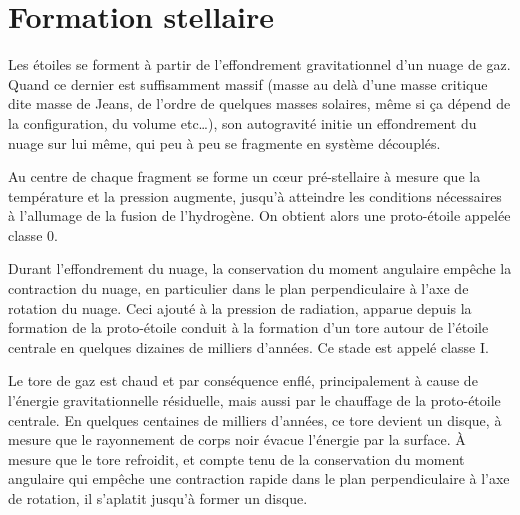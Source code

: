 




\section{Formation stellaire}
Les étoiles se forment à partir de l'effondrement gravitationnel d'un nuage de gaz. Quand ce dernier est suffisamment massif (masse au delà d'une masse critique dite masse de Jeans, de l'ordre de quelques masses solaires, même si ça dépend de la configuration, du volume etc\dots), son autogravité initie un effondrement du nuage sur lui même, qui peu à peu se fragmente en système découplés. 

Au centre de chaque fragment se forme un cœur pré-stellaire à mesure que la température et la pression augmente, jusqu'à atteindre les conditions nécessaires à l'allumage de la fusion de l'hydrogène. On obtient alors une proto-étoile appelée \og classe 0\fg. 

Durant l'effondrement du nuage, la conservation du moment angulaire empêche la contraction du nuage, en particulier dans le plan perpendiculaire à l'axe de rotation du nuage. Ceci ajouté à la pression de radiation, apparue depuis la formation de la proto-étoile conduit à la formation d'un tore autour de l'étoile centrale en quelques dizaines de milliers d'années. Ce stade est appelé \og classe I\fg.

Le tore de gaz est chaud et par conséquence enflé, principalement à cause de l'énergie gravitationnelle résiduelle, mais aussi par le chauffage de la proto-étoile centrale.
En quelques centaines de milliers d'années, ce tore devient un disque, à mesure que le rayonnement de corps noir évacue l'énergie par la surface. À mesure que le tore refroidit, et compte tenu de la conservation du moment angulaire qui empêche une contraction rapide dans le plan perpendiculaire à l'axe de rotation, il s'aplatit jusqu'à former un disque. 

